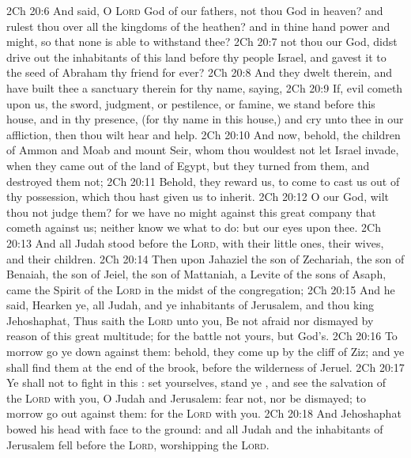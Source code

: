 \vs 2Ch 20:6 And said, O \textsc{Lord} God of our fathers,  not thou God in heaven? and rulest  thou over all the kingdoms of the heathen? and in thine hand  power and might, so that none is able to withstand thee?
\vs 2Ch 20:7  not thou our God,  didst drive out the inhabitants of this land before thy people Israel, and gavest it to the seed of Abraham thy friend for ever?
\vs 2Ch 20:8 And they dwelt therein, and have built thee a sanctuary therein for thy name, saying,
\vs 2Ch 20:9 If,  evil cometh upon us,  the sword, judgment, or pestilence, or famine, we stand before this house, and in thy presence, (for thy name  in this house,) and cry unto thee in our affliction, then thou wilt hear and help.
\vs 2Ch 20:10 And now, behold, the children of Ammon and Moab and mount Seir, whom thou wouldest not let Israel invade, when they came out of the land of Egypt, but they turned from them, and destroyed them not;
\vs 2Ch 20:11 Behold,  they reward us, to come to cast us out of thy possession, which thou hast given us to inherit.
\vs 2Ch 20:12 O our God, wilt thou not judge them? for we have no might against this great company that cometh against us; neither know we what to do: but our eyes  upon thee.
\vs 2Ch 20:13 And all Judah stood before the \textsc{Lord}, with their little ones, their wives, and their children.
\vs 2Ch 20:14 Then upon Jahaziel the son of Zechariah, the son of Benaiah, the son of Jeiel, the son of Mattaniah, a Levite of the sons of Asaph, came the Spirit of the \textsc{Lord} in the midst of the congregation;
\vs 2Ch 20:15 And he said, Hearken ye, all Judah, and ye inhabitants of Jerusalem, and thou king Jehoshaphat, Thus saith the \textsc{Lord} unto you, Be not afraid nor dismayed by reason of this great multitude; for the battle  not yours, but God's.
\vs 2Ch 20:16 To morrow go ye down against them: behold, they come up by the cliff of Ziz; and ye shall find them at the end of the brook, before the wilderness of Jeruel.
\vs 2Ch 20:17 Ye shall not  to fight in this : set yourselves, stand ye , and see the salvation of the \textsc{Lord} with you, O Judah and Jerusalem: fear not, nor be dismayed; to morrow go out against them: for the \textsc{Lord}  with you.
\vs 2Ch 20:18 And Jehoshaphat bowed his head with  face to the ground: and all Judah and the inhabitants of Jerusalem fell before the \textsc{Lord}, worshipping the \textsc{Lord}.
